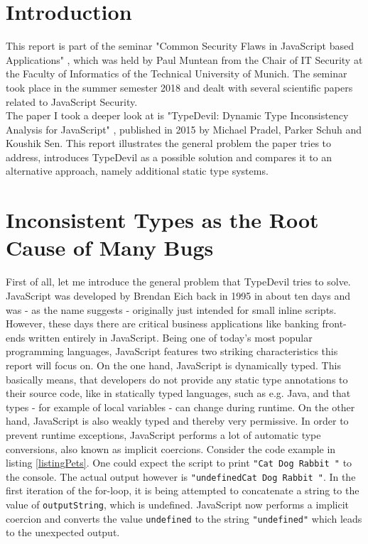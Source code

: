 \documentclass[runningheads,a4paper]{llncs}
\begin{document}
    \newpage

\setcounter{tocdepth}{2}
\tableofcontents
\newpage
\lstlistoflistings %
\newpage

\section{Introduction}

This report is part of the seminar "Common Security Flaws in JavaScript based Applications" \cite{CommonSecFlaws}, which was held by Paul Muntean from the Chair of IT Security at the Faculty of Informatics of the Technical University of Munich.
The seminar took place in the summer semester 2018 and dealt with several scientific papers related to JavaScript Security. \\
The paper I took a deeper look at is "TypeDevil: Dynamic Type Inconsistency Analysis for JavaScript" \cite{DBLP:conf/icse/PradelSS15}, published in 2015 by Michael Pradel, Parker Schuh and Koushik Sen.
This report illustrates the general problem the paper tries to address, introduces TypeDevil as a possible solution and compares it to an alternative approach, namely additional static type systems. 

\section{Inconsistent Types as the Root Cause of Many Bugs}
First of all, let me introduce the general problem that TypeDevil tries to solve. \\
JavaScript was developed by Brendan Eich back in 1995 in about ten days and was - as the name suggests - originally just intended for small inline scripts.
However, these days there are critical business applications like banking front-ends written entirely in JavaScript. 
Being one of today's most popular programming languages, JavaScript features two striking characteristics this report will focus on. 
On the one hand, JavaScript is dynamically typed. 
This basically means, that developers do not provide any static type annotations to their source code, like in statically typed languages, such as e.g. Java, and that types - for example of local variables - can change during runtime.
On the other hand, JavaScript is also weakly typed and thereby very permissive. In order to prevent runtime exceptions, JavaScript performs a lot of automatic type conversions, also known as implicit coercions.
Consider the code example in listing \ref{listingPets}. 
One could expect the script to print \lstinline[columns=fixed]{"Cat Dog Rabbit "} to the console.
The actual output however is \lstinline[columns=fixed]{"undefinedCat Dog Rabbit "}. 
In the first iteration of the for-loop, it is being attempted to concatenate a string to the value of \lstinline[columns=fixed]{outputString}, which is undefined. 
JavaScript now performs a implicit coercion and converts the value \lstinline[columns=fixed]{undefined} to the string \lstinline[columns=fixed]{"undefined"} which leads to the unexpected output.
\end{document}
